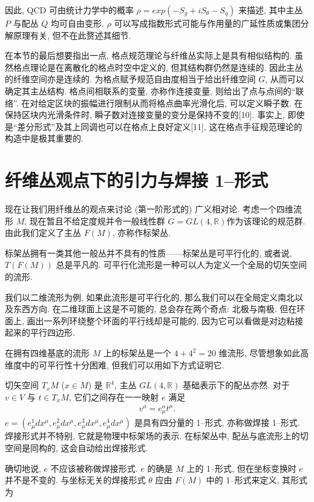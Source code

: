 \documentclass{article}
\begin{document}
\par 因此, QCD 可由统计力学中的概率 $\rho= exp(-S_g +iS_\theta-S_q)$ 来描述, 其中主丛 $P$ 与配丛 $Q$ 均可自由变形. $\rho$ 可以写成指数形式可能与作用量的广延性质或集团分解原理有关, 但不在此赘述其细节.

\par 在本节的最后想要指出一点, 格点规范理论与纤维丛实际上是具有相似结构的. 虽然格点理论是在离散化的格点时空中定义的, 但其结构群仍然是连续的. 因此主丛的纤维空间亦是连续的. 为格点赋予规范自由度相当于给出纤维空间 $G$, 从而可以确定其主丛结构. 格点间相联系的变量, 亦称作连接变量, 则给出了点与点间的``联络''. 在对给定区块的振幅进行限制从而将格点曲率光滑化后, 可以定义瞬子数. 在保持区块内光滑条件时, 瞬子数对连接变量的变分是保持不变的[10]. 事实上, 即使是``差分形式''及其上同调也可以在格点上良好定义[11], 这在格点手征规范理论的构造中是极其重要的.
\section{纤维丛观点下的引力与焊接 1--形式}
现在让我们用纤维丛的观点来讨论 (第一阶形式的) 广义相对论. 考虑一个四维流形 $M$, 现在暂且不给定度规并令一般线性群 $G=GL(4,\mathbb{R})$作为该理论的规范群. 由此我们定义了主丛 $F(M)$, 亦称作标架丛.
\par
标架丛拥有一类其他一般丛并不具有的性质——标架丛是可平行化的, 或者说, $T(F(M))$ 总是平凡的. 可平行化流形是一种可以人为定义一个全局的切矢空间的流形.
\par
我们以二维流形为例, 如果此流形是可平行化的, 那么我们可以在全局定义南北以及东西方向. 在二维球面上这是不可能的, 总会存在两个奇点: 北极与南极. 但在环面上, 画出一系列环绕整个环面的平行线却是可能的, 因为它可以看做是对边粘接起来的平行四边形.
\par
在拥有四维基底的流形 $M$ 上的标架丛是一个 $4+4^{2}=20$ 维流形, 尽管想象如此高维度中的可平行性十分困难, 但我们可以用如下方式证明它.
\par
切矢空间 $T_{x}M$ ($x\in M$) 是 $\mathbb{R}^{4}$, 主丛 $GL(4,\mathbb{R})$ 基础表示下的配丛亦然. 对于 $v\in V$ 与 $t\in T_{x}M$, 它们之间存在一一映射 $e$ 满足
\begin{align}
v^{a}=e^{a}_{\mu}t^{\mu}.
\end{align}
$e=(e_{\mu}^{1}dx^{\mu},e_{\mu}^{2}dx^{\mu},e_{\mu}^{3}dx^{\mu},e_{\mu}^{4}dx^{\mu})$ 是具有四分量的 1--形式, 亦称做焊接 1--形式. 焊接形式并不特别, 它就是物理中标架场的表示. 在标架丛中, 配丛与底流形上的切空间是同构的, 这会自动给出焊接形式.
\par
确切地说, $e$ 不应该被称做焊接形式. $e$ 的确是 $M$ 上的 1--形式, 但在坐标变换时 $e$ 并不是不变的. 与坐标无关的焊接形式 $\theta$ 应由 $F(M)$ 中的 1--形式来定义, 其形式为
\end{document}
